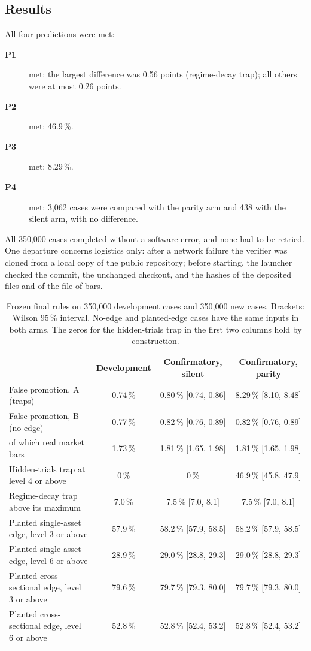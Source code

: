 \documentclass[11pt]{article}
\newcommand{\term}[1]{\item[\textbf{#1}]}
\begin{document}
\subsection{Results}

All four predictions were met:
\begin{description}
\term{P1} met: the largest difference was 0.56 points (regime-decay trap); all others were at most 0.26 points.
\term{P2} met: 46.9\,\%.
\term{P3} met: 8.29\,\%.
\term{P4} met: 3,062 cases were compared with the parity arm and 438 with the silent arm, with no difference.
\end{description}
All 350,000 cases completed without a software error, and none had to be retried. One departure concerns logistics
only: after a network failure the verifier was cloned from a local copy of the public repository; before starting, the
launcher checked the commit, the unchanged checkout, and the hashes of the deposited files and of the file of bars.

\begin{table}[ht]
\centering\small
\begin{tabular}{@{}lccc@{}}
\toprule
 & Development & Confirmatory, silent & Confirmatory, parity\\
\midrule
False promotion, A (traps) & 0.74\,\% & 0.80\,\% [0.74, 0.86] & 8.29\,\% [8.10, 8.48] \\
False promotion, B (no edge) & 0.77\,\% & 0.82\,\% [0.76, 0.89] & 0.82\,\% [0.76, 0.89] \\
\quad of which real market bars & 1.73\,\% & 1.81\,\% [1.65, 1.98] & 1.81\,\% [1.65, 1.98] \\
Hidden-trials trap at level 4 or above & 0\,\% & 0\,\% & 46.9\,\% [45.8, 47.9] \\
Regime-decay trap above its maximum & 7.0\,\% & 7.5\,\% [7.0, 8.1] & 7.5\,\% [7.0, 8.1] \\
Planted single-asset edge, level 3 or above & 57.9\,\% & 58.2\,\% [57.9, 58.5] & 58.2\,\% [57.9, 58.5] \\
Planted single-asset edge, level 6 or above & 28.9\,\% & 29.0\,\% [28.8, 29.3] & 29.0\,\% [28.8, 29.3] \\
Planted cross-sectional edge, level 3 or above & 79.6\,\% & 79.7\,\% [79.3, 80.0] & 79.7\,\% [79.3, 80.0] \\
Planted cross-sectional edge, level 6 or above & 52.8\,\% & 52.8\,\% [52.4, 53.2] & 52.8\,\% [52.4, 53.2] \\
\bottomrule
\end{tabular}
\caption{Frozen final rules on 350,000 development cases and 350,000 new cases. Brackets: Wilson 95\,\% interval.
No-edge and planted-edge cases have the same inputs in both arms. The zeros for the hidden-trials trap in the first two
columns hold by construction.}\label{tab:confirm}
\end{table}
\end{document}
